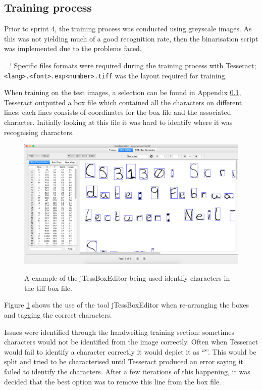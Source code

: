 \subsection{Training process}
Prior to sprint 4, the training process was conducted using greyscale images. As this was not yielding much of a good recognition rate, then the binarisation script was implemented due to the problems faced.
{{\ttfamily \hyphenchar\the\font=`\-}%
Specific files formats were required during the training process with Tesseract; \texttt{<lang>.<font>.exp<number>.tiff} was the layout required for training.

When training on the test images, a selection can be found in Appendix \ref{}, Tesseract outputted a box file which contained all the characters on different lines; each lines consists of coordinates for the box file and the associated character. Initially looking at this file it was hard to identify where it was recognising characters.

\begin{figure}[H]
  \centering
  \includegraphics[width=\textwidth]{images/box_editor}
  \label{fig:box_editor}
  \caption{A example of the jTessBoxEditor being used identify characters in the tiff box file.}
\end{figure}

Figure \ref{fig:box_editor} shows the use of the tool jTessBoxEditor \cite{citeulike:13926798} when re-arranging the boxes and tagging the correct characters.

Issues were identified through the handwriting training section: sometimes characters would not be identified from the image correctly. Often when Tesseract would fail to identify a character correctly it would depict it as ``\~''. This would be split and tried to be characterised until Tesseract produced an error saying it failed to identify the characters. After a few iterations of this happening, it was decided that the best option was to remove this line from the box file.

}
